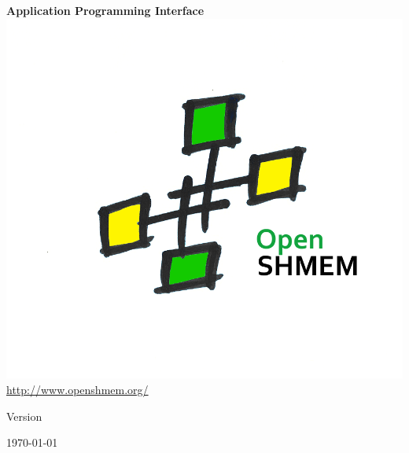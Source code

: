 \thispagestyle{empty}
\begin{center}
\textbf{\Huge \openshmem}
\par
\end{center}

\begin{center}
\textbf{\LARGE Application Programming Interface}\\
\includegraphics[scale=0.65]{figures/OpenSHMEM_Pound}\\
\url{http://www.openshmem.org/}
\par
\end{center}

\begin{center}
Version \insertDocVersion
\par
\end{center}

\vspace{0.5in}
\begin{center}
\today
\end{center}

\vspace{0.5in}

\vfill{}

